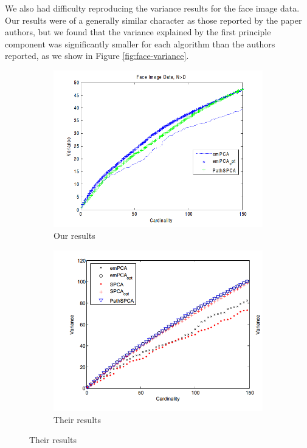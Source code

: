 \documentclass{article}
\begin{document}
We also had difficulty reproducing the variance results for the
face image data. Our results were of a generally similar character
as those reported by the paper authors, but we found that the variance
explained by the first principle component was significantly smaller
for each algorithm than the authors reported, as we show
in Figure \ref{fig:face-variance}.

\begin{figure}[h,width=\textwidth]
\caption{Variance versus cardinality for face data}
\label{fig:face-variance}
\begin{subfigure}{0.5\textwidth}
\caption{Our results}
\includegraphics[width=\textwidth]{4.png}
\end{subfigure}
\begin{subfigure}{0.5\textwidth}
\caption{Their results}
\includegraphics[width=\textwidth]{3.png}
\end{subfigure}
\end{figure}
\end{document}
